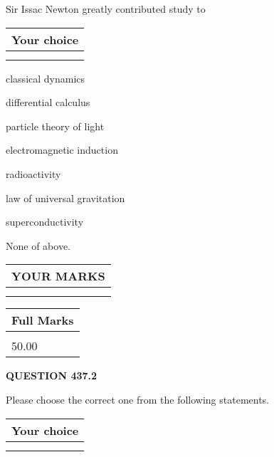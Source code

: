 \documentclass[12pt]{article}
\begin{document}
  
Sir Issac Newton greatly contributed study to
  
  
\noindent\hspace{3.0in} \begin{tabular}{|l|}
\hline
Your choice \\
\hline
 \\ 
 \\ 
\hline
\end{tabular}
  
  
 
 
classical dynamics
 
 
differential calculus
 
 
particle theory of light
 
 
electromagnetic induction
 
 
radioactivity
 
 
law of universal gravitation
 
 
superconductivity
 
 
 None of above.
 
 
  
\vspace{0.2in}
  
\noindent\begin{tabular}{|l|}
\hline
 YOUR MARKS  \\
\hline
 \\ 
 \\ 
\hline
\end{tabular}
\hspace{0.05in} \begin{tabular}{|l|}
\hline
 Full Marks  \\
\hline
 \\ 
50.00 \\
\hline
\end{tabular}
{\textbf{\Large{QUESTION
437.2 
}}}
  
  
Please choose the correct one from the following statements.
  
  
\noindent\hspace{3.0in} \begin{tabular}{|l|}
\hline
Your choice \\
\hline
 \\ 
 \\ 
\hline
\end{tabular}
  
\end{document}
